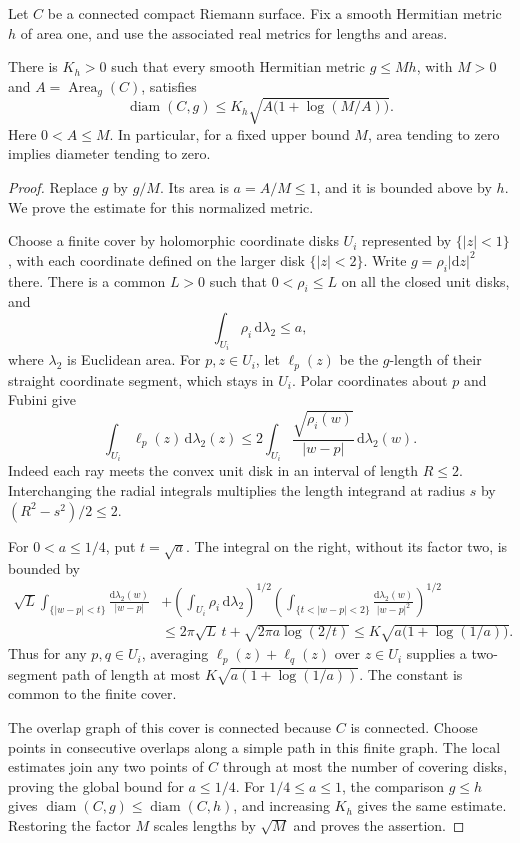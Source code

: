 
Let $C$ be a connected compact Riemann surface. Fix a smooth Hermitian metric $h$ of area one, and use the associated real metrics for lengths and areas.

\begin{lemma}\label{lem:conformal-area-diameter}
There is $K_h>0$ such that every smooth Hermitian metric $g\leq M h$, with $M>0$ and $A=\operatorname{Area}_g(C)$, satisfies
\[
 \operatorname{diam}(C,g)
 \leq K_h\sqrt{A\bigl(1+\log(M/A)\bigr)}.
\]
Here $0<A\leq M$. In particular, for a fixed upper bound $M$, area tending to zero implies diameter tending to zero.
\end{lemma}
\begin{proof}
Replace $g$ by $g/M$. Its area is $a=A/M\leq1$, and it is bounded above by $h$. We prove the estimate for this normalized metric.

Choose a finite cover by holomorphic coordinate disks $U_i$ represented by $\{|z|<1\}$, with each coordinate defined on the larger disk $\{|z|<2\}$. Write $g=\rho_i|\mathrm{d}z|^2$ there. There is a common $L>0$ such that $0<\rho_i\leq L$ on all the closed unit disks, and
\[
 \int_{U_i}\rho_i\,\mathrm{d}\lambda_2\leq a,
\]
where $\lambda_2$ is Euclidean area. For $p,z\in U_i$, let $\ell_p(z)$ be the $g$-length of their straight coordinate segment, which stays in $U_i$. Polar coordinates about $p$ and Fubini give
\[
 \int_{U_i}\ell_p(z)\,\mathrm{d}\lambda_2(z)
 \leq 2\int_{U_i}\frac{\sqrt{\rho_i(w)}}{|w-p|}
                    \,\mathrm{d}\lambda_2(w).
\]
Indeed each ray meets the convex unit disk in an interval of length $R\leq2$. Interchanging the radial integrals multiplies the length integrand at radius $s$ by $(R^2-s^2)/2\leq2$.

For $0<a\leq1/4$, put $t=\sqrt a$. The integral on the right, without its factor two, is bounded by
\[
 \begin{split}
 \sqrt L\int_{\{|w-p|<t\}}\frac{\mathrm{d}\lambda_2(w)}{|w-p|}
 &+\left(\int_{U_i}\rho_i\,\mathrm{d}\lambda_2\right)^{1/2}
   \left(\int_{\{t<|w-p|<2\}}\frac{\mathrm{d}\lambda_2(w)}{|w-p|^2}\right)^{1/2}\\
 &\leq 2\pi\sqrt L\,t+\sqrt{2\pi a\log(2/t)}
 \leq K\sqrt{a\bigl(1+\log(1/a)\bigr)}.
 \end{split}
\]
Thus for any $p,q\in U_i$, averaging $\ell_p(z)+\ell_q(z)$ over $z\in U_i$ supplies a two-segment path of length at most $K\sqrt{a(1+\log(1/a))}$. The constant is common to the finite cover.

The overlap graph of this cover is connected because $C$ is connected. Choose points in consecutive overlaps along a simple path in this finite graph. The local estimates join any two points of $C$ through at most the number of covering disks, proving the global bound for $a\leq1/4$. For $1/4\leq a\leq1$, the comparison $g\leq h$ gives $\operatorname{diam}(C,g)\leq\operatorname{diam}(C,h)$, and increasing $K_h$ gives the same estimate. Restoring the factor $M$ scales lengths by $\sqrt M$ and proves the assertion.
\end{proof}


